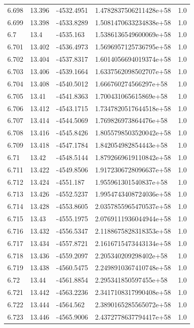 \begin{tabular}{lllll}
6.698 & 13.396 & -4532.4951 & 1.4782837506211428e+58 & 1.0 \\
6.699 & 13.398 & -4533.8289 & 1.5081470633234838e+58 & 1.0 \\
6.7 & 13.4 & -4535.163 & 1.5386136549600069e+58 & 1.0 \\
6.701 & 13.402 & -4536.4973 & 1.5696957125736795e+58 & 1.0 \\
6.702 & 13.404 & -4537.8317 & 1.6014056694019374e+58 & 1.0 \\
6.703 & 13.406 & -4539.1664 & 1.6337562098502707e+58 & 1.0 \\
6.704 & 13.408 & -4540.5012 & 1.666760274566297e+58 & 1.0 \\
6.705 & 13.41 & -4541.8363 & 1.700431065615869e+58 & 1.0 \\
6.706 & 13.412 & -4543.1715 & 1.7347820517644518e+58 & 1.0 \\
6.707 & 13.414 & -4544.5069 & 1.769826973864476e+58 & 1.0 \\
6.708 & 13.416 & -4545.8426 & 1.8055798503520042e+58 & 1.0 \\
6.709 & 13.418 & -4547.1784 & 1.842054982854443e+58 & 1.0 \\
6.71 & 13.42 & -4548.5144 & 1.8792669619110842e+58 & 1.0 \\
6.711 & 13.422 & -4549.8506 & 1.9172306728096637e+58 & 1.0 \\
6.712 & 13.424 & -4551.187 & 1.955961301540837e+58 & 1.0 \\
6.713 & 13.426 & -4552.5237 & 1.9954743408724036e+58 & 1.0 \\
6.714 & 13.428 & -4553.8605 & 2.0357855965470537e+58 & 1.0 \\
6.715 & 13.43 & -4555.1975 & 2.0769111936044944e+58 & 1.0 \\
6.716 & 13.432 & -4556.5347 & 2.1188675828318353e+58 & 1.0 \\
6.717 & 13.434 & -4557.8721 & 2.1616715473443134e+58 & 1.0 \\
6.718 & 13.436 & -4559.2097 & 2.205340209298402e+58 & 1.0 \\
6.719 & 13.438 & -4560.5475 & 2.2498910367410748e+58 & 1.0 \\
6.72 & 13.44 & -4561.8854 & 2.295341850597455e+58 & 1.0 \\
6.721 & 13.442 & -4563.2236 & 2.3417108317990408e+58 & 1.0 \\
6.722 & 13.444 & -4564.562 & 2.3890165285565072e+58 & 1.0 \\
6.723 & 13.446 & -4565.9006 & 2.4372778637794417e+58 & 1.0 \\

\end{tabular}
